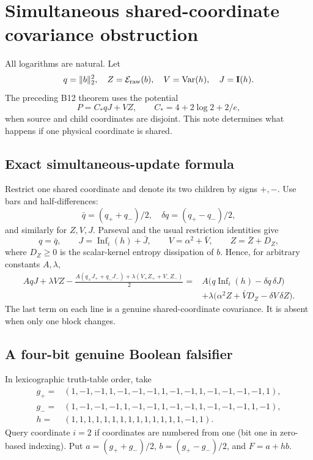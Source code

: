 \section*{Simultaneous shared-coordinate covariance obstruction}

All logarithms are natural.  Let
\[
 q=\|b\|_2^2,\quad Z=\mathcal E_{\rm raw}(b),\quad
 V=\operatorname{Var}(h),\quad J=\mathbf I(h).
\]
The preceding B12 theorem uses the potential
\[
 P=C_*qJ+VZ,\qquad C_*=4+2\log2+2/e,
\]
when source and child coordinates are disjoint.  This note determines what
happens if one physical coordinate is shared.

\subsection*{Exact simultaneous-update formula}

Restrict one shared coordinate and denote its two children by signs \(+,-\).
Use bars and half-differences:
\[
 \bar q=(q_++q_-)/2,\quad \delta q=(q_+-q_-)/2,
\]
and similarly for \(Z,V,J\).  Parseval and the usual restriction identities
give
\[
 q=\bar q,\qquad J=\operatorname{Inf}_i(h)+\bar J,
 \qquad V=\alpha^2+\bar V,
 \qquad Z=\bar Z+D_Z,
\]
where \(D_Z\ge0\) is the scalar-kernel entropy dissipation of \(b\).  Hence,
for arbitrary constants \(A,\lambda\),
\begin{align}
 AqJ+\lambda VZ-\frac{A(q_+J_++q_-J_-)
 +\lambda(V_+Z_++V_-Z_-)}2
 ={}&A\bigl(q\operatorname{Inf}_i(h)-\delta q\,\delta J\bigr)\\
 &+\lambda\bigl(\alpha^2Z+\bar V D_Z-\delta V\,\delta Z\bigr).
 \tag{1}
\end{align}
The last term on each line is a genuine shared-coordinate covariance.  It is
absent when only one block changes.

\subsection*{A four-bit genuine Boolean falsifier}

In lexicographic truth-table order, take
\[
\begin{split}
 g_+={}&(1,-1,-1,1,-1,-1,-1,1,-1,-1,1,-1,-1,-1,-1,1),\\
 g_-={}&(1,-1,-1,-1,1,-1,-1,1,-1,-1,1,-1,-1,-1,1,-1),\\
 h={}&(1,1,1,1,1,1,1,1,1,1,1,1,1,1,-1,1).
\end{split}
\tag{2}
\]
Query coordinate \(i=2\) if coordinates are numbered from one (bit one in
zero-based indexing).  Put \(a=(g_++g_-)/2\),
\(b=(g_+-g_-)/2\), and \(F=a+hb\).

